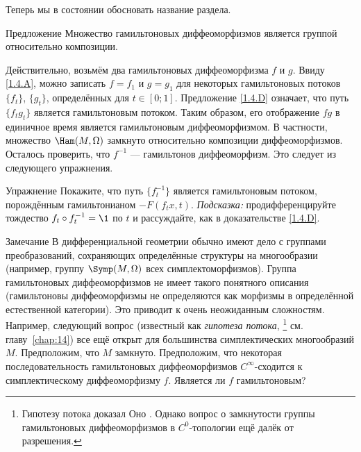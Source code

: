 Теперь мы в состоянии обосновать название раздела.

\begin{thm}{Предложение}
Множество гамильтоновых диффеоморфизмов является группой относительно композиции.
\end{thm}

Действительно, возьмём два гамильтоновых диффеоморфизма $f$ и $g$.
Ввиду \ref{1.4.A}, можно записать $f = f_1$ и $g = g_1$ для некоторых гамильтоновых потоков $\{f_t\}$, $\{g_t\}$, определённых для $t \in [0; 1]$.
Предложение \ref{1.4.D} означает, что путь $\{f_t g_t\}$ является гамильтоновым потоком.
Таким образом, его отображение $f g$ в единичное время является гамильтоновым диффеоморфизмом.
В частности, множество $\Ham (M, \Omega)$ замкнуто относительно композиции диффеоморфизмов.
Осталось проверить, что $f^{-1}$ — гамильтонов диффеоморфизм.
Это следует из следующего упражнения.

\begin{ex*}{Упражнение} Покажите, что путь $\{f_t^{-1}\}$ является гамильтоновым потоком, порождённым гамильтонианом $-F (f_t x, t)$.
\emph{Подсказка:} продифференцируйте тождество $f_t \circ f_t^{-1} = \1$ по $t$ и рассуждайте, как в доказательстве \ref{1.4.D}.
\end{ex*}

\begin{ex}{Замечание}\label{1.4.F}
В дифференциальной геометрии обычно имеют дело с группами
преобразований, сохраняющих определённые структуры на многообразии
(например, группу $\Symp(M,\Omega)$ всех симплектоморфизмов).
Группа гамильтоновых диффеоморфизмов не имеет такого понятного
описания (гамильтоновы диффеоморфизмы не определяются как морфизмы в
определённой естественной категории).
Это приводит к очень неожиданным сложностям. 
Например, следующий вопрос (известный как \emph{гипотеза потока},%
\footnote{
Гипотезу потока доказал Оно \cite{O06}.
Однако вопрос о замкнутости группы гамильтоновых диффеоморфизмов в $C^{0}$-топологии
ещё далёк от разрешения.\dpp}
см. главу~\ref{chap:14}) все ещё
открыт для большинства симплектических многообразий $M$.
Предположим, что $M$ замкнуто.
Предположим, что некоторая последовательность гамильтоновых
диффеоморфизмов $C^\infty$-сходится к симплектическому диффеоморфизму
$f$.
Является ли $f$ гамильтоновым?
\end{ex}

